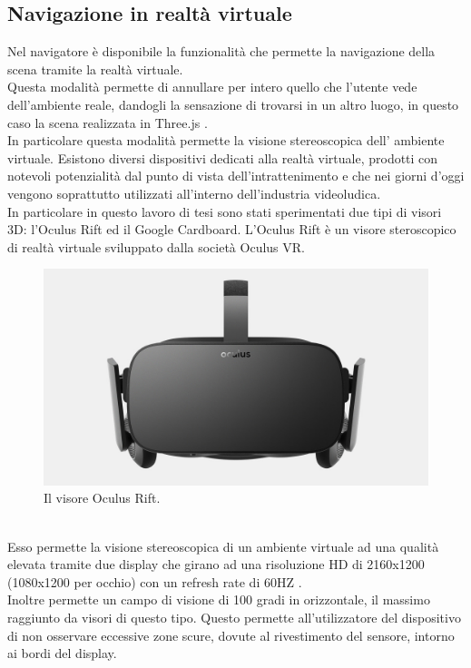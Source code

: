 \subsection{Navigazione in realtà virtuale}
Nel navigatore è disponibile la funzionalità che permette la navigazione della scena tramite la realtà virtuale.
\\
Questa modalità permette di annullare per intero quello che l’utente vede dell’ambiente reale, dandogli la sensazione di trovarsi in un altro luogo, in questo caso la scena realizzata in Three.js \cite{realtavirt}.
\\
In particolare questa modalità permette la visione stereoscopica dell’ ambiente virtuale.
Esistono diversi dispositivi dedicati alla realtà virtuale, prodotti con notevoli potenzialità dal punto di vista dell’intrattenimento e che nei giorni d’oggi vengono soprattutto utilizzati all’interno dell’industria videoludica.
\\
In particolare in questo lavoro di tesi sono stati sperimentati due tipi di visori 3D: l’Oculus Rift ed il Google Cardboard. 
L’Oculus Rift è un visore steroscopico di realtà virtuale sviluppato dalla società Oculus VR.
\begin{figure}[htb]
 \centering
 \includegraphics[width=0.8\linewidth]{images/chapter_navigazione_scena/oculus.jpg}\hfill
 \caption[Il visore Oculus Rift.]{Il visore Oculus Rift.}
 \label{fig:navigazione_scena_navigator_oculus}
\end{figure}
\\
Esso permette la visione stereoscopica di un ambiente virtuale ad una qualità elevata tramite due display che girano ad una risoluzione HD di 2160x1200 (1080x1200 per occhio) con un refresh rate di 60HZ \cite{oculus_caratt}.
\\
Inoltre permette un campo di visione di 100 gradi in orizzontale, il massimo raggiunto da visori di questo tipo. Questo permette all’utilizzatore del dispositivo di non osservare eccessive zone scure, dovute al rivestimento del sensore, intorno ai bordi del display. 

